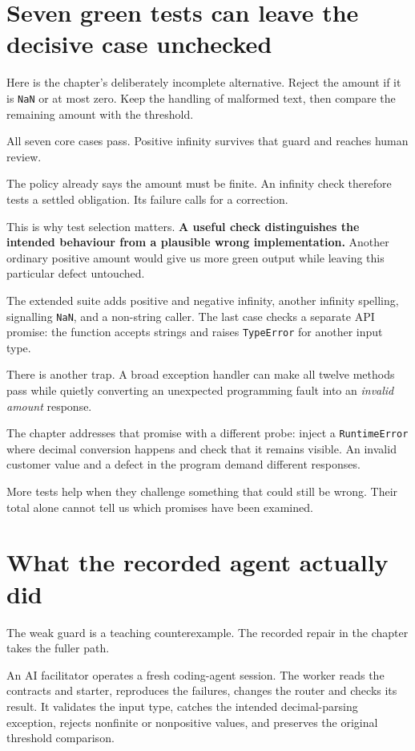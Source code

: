 \documentclass[11pt]{article}
\begin{document}
\clearpage
\section{Seven green tests can leave the decisive case unchecked}

Here is the chapter's deliberately incomplete alternative. Reject the amount if it is \texttt{NaN} or at most zero. Keep the handling of malformed text, then compare the remaining amount with the threshold.

All seven core cases pass. Positive infinity survives that guard and reaches human review.

The policy already says the amount must be finite. An infinity check therefore tests a settled obligation. Its failure calls for a correction.

This is why test selection matters. \textbf{A useful check distinguishes the intended behaviour from a plausible wrong implementation.} Another ordinary positive amount would give us more green output while leaving this particular defect untouched.

The extended suite adds positive and negative infinity, another infinity spelling, signalling \texttt{NaN}, and a non-string caller. The last case checks a separate API promise: the function accepts strings and raises \texttt{TypeError} for another input type.

There is another trap. A broad exception handler can make all twelve methods pass while quietly converting an unexpected programming fault into an \emph{invalid amount} response.

The chapter addresses that promise with a different probe: inject a \texttt{RuntimeError} where decimal conversion happens and check that it remains visible. An invalid customer value and a defect in the program demand different responses.

More tests help when they challenge something that could still be wrong. Their total alone cannot tell us which promises have been examined.

\section{What the recorded agent actually did}

The weak guard is a teaching counterexample. The recorded repair in the chapter takes the fuller path.

An AI facilitator operates a fresh coding-agent session. The worker reads the contracts and starter, reproduces the failures, changes the router and checks its result. It validates the input type, catches the intended decimal-parsing exception, rejects nonfinite or nonpositive values, and preserves the original threshold comparison.
\end{document}
